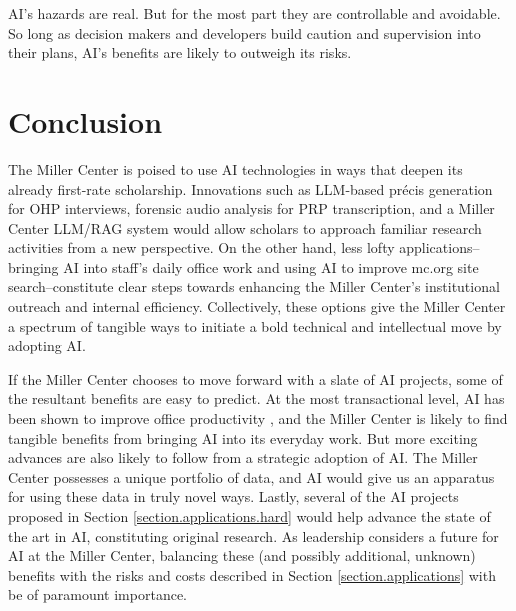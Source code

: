 \documentclass[12pt, oneside]{article}   	%
\begin{document}
AI's hazards are real.  But for the most part they are controllable and avoidable.  So long as decision makers and developers build caution and supervision into their plans, AI's benefits are likely to outweigh its risks.



\section{Conclusion}\label{section.conclusion}
The Miller Center is poised to use AI technologies in ways that deepen its already first-rate scholarship.  Innovations such as LLM-based pr\'{e}cis generation for OHP interviews, forensic audio analysis for PRP transcription, and a Miller Center LLM/RAG system would allow scholars to approach  familiar research activities from a new perspective.  On the other hand, less lofty applications--bringing AI into staff's daily office work and using AI to improve mc.org site search--constitute clear steps towards enhancing the Miller Center's institutional outreach and internal efficiency.  Collectively, these options give the Miller Center a spectrum of tangible ways to initiate a bold technical and intellectual move by adopting AI.

If the Miller Center chooses to move forward with a slate of AI projects, some of the resultant benefits are easy to predict.  At the most transactional level, AI has been shown to improve office productivity \cite{candelon:2023}, and the Miller Center is likely to find tangible benefits from bringing AI into its everyday work.  But more exciting advances are also likely to follow from a strategic adoption of AI.  The Miller Center possesses a unique portfolio of data, and AI would give us an apparatus for using these data in truly novel ways.  Lastly, several of the AI projects  proposed in Section \ref{section.applications.hard} would help advance the state of the art in AI, constituting original research.  As leadership considers a future for AI at the Miller Center, balancing these (and possibly additional, unknown) benefits with the risks and costs described in Section \ref{section.applications} with be of paramount importance.
\end{document}
